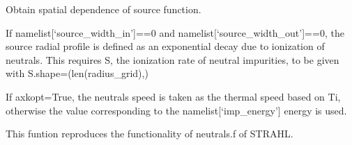 \documentclass[letterpaper,10pt,english]{sphinxmanual}
\begin{document}

\begin{fulllineitems}
\label{\detokenize{aurora:aurora.source_utils.get_radial_source}}
Obtain spatial dependence of source function.

If namelist{[}‘source\_width\_in’{]}==0 and namelist{[}‘source\_width\_out’{]}==0, the source
radial profile is defined as an exponential decay due to ionization of neutrals. This requires
S, the ionization rate of neutral impurities, to be given with S.shape=(len(radius\_grid),)

If axkopt=True, the neutrals speed is taken as the thermal speed based on Ti, otherwise
the value corresponding to the namelist{[}‘imp\_energy’{]} energy is used.

This funtion reproduces the functionality of neutrals.f of STRAHL.

\end{fulllineitems}

\end{document}
